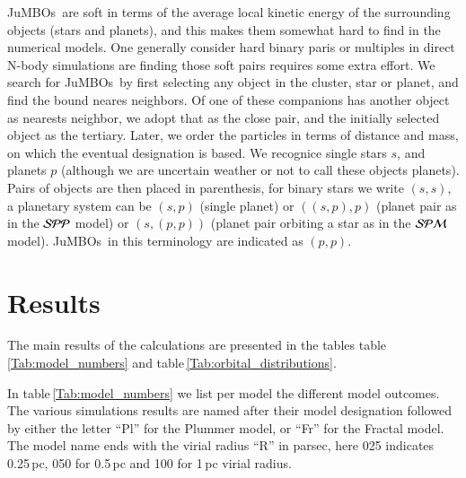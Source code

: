 \documentclass[submission,phys]{lib/SciPost}
\newcommand{\jumbos}{\mbox{JuMBOs}}
\begin{document}
\jumbos\, are soft in terms of the average local kinetic energy of the
surrounding objects (stars and planets), and this makes them somewhat
hard to find in the numerical models.  One generally consider hard
binary paris or multiples in direct N-body simulations are finding
those soft pairs requires some extra effort.  We search for \jumbos\,
by first selecting any object in the cluster, star or planet, and find
the bound neares neighbors. Of one of these companions has another
object as nearests neighbor, we adopt that as the close pair, and the
initially selected object as the tertiary. Later, we order the
particles in terms of distance and mass, on which the eventual
designation is based. We recognice single stars $s$, and planets $p$
(although we are uncertain weather or not to call these objects
planets). Pairs of objects are then placed in parenthesis, for binary
stars we write $(s,s)$, a planetary system can be $(s,p)$ (single
planet) or $((s,p),p)$ (planet pair as in the ${\cal SPP}$ model) or
$(s,(p,p))$ (planet pair orbiting a star as in the ${\cal SPM}$
model). \jumbos\, in this terminology are indicated as $(p,p)$.

\section{Results}

The main results of the calculations are presented in the tables
table\,\ref{Tab:model_numbers} and
table\,\ref{Tab:orbital_distributions}.

In table\,\ref{Tab:model_numbers} we list per model the different
model outcomes.  The various simulations results are named after their
model designation followed by either the letter ``Pl'' for the Plummer
model, or ``Fr'' for the Fractal model.  The model name ends with the
virial radius ``R'' in parsec, here 025 indicates 0.25\,pc, 050 for
0.5\,pc and 100 for 1\,pc virial radius.
\end{document}
